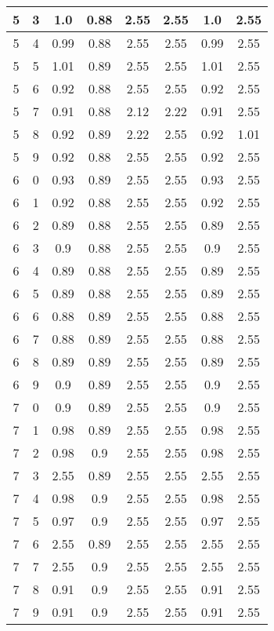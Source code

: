 \begin{longtable}{|c|c||c||c|c|c||c|c|}
	5 & 3 & 1.0 & 0.88 & 2.55 & 2.55 & 1.0 & 2.55 \\ \hline
	5 & 4 & 0.99 & 0.88 & 2.55 & 2.55 & 0.99 & 2.55 \\ \hline
	5 & 5 & 1.01 & 0.89 & 2.55 & 2.55 & 1.01 & 2.55 \\ \hline
	5 & 6 & 0.92 & 0.88 & 2.55 & 2.55 & 0.92 & 2.55 \\ \hline
	5 & 7 & 0.91 & 0.88 & 2.12 & 2.22 & 0.91 & 2.55 \\ \hline
	5 & 8 & 0.92 & 0.89 & 2.22 & 2.55 & 0.92 & 1.01 \\ \hline
	5 & 9 & 0.92 & 0.88 & 2.55 & 2.55 & 0.92 & 2.55 \\ \hline
	6 & 0 & 0.93 & 0.89 & 2.55 & 2.55 & 0.93 & 2.55 \\ \hline
	6 & 1 & 0.92 & 0.88 & 2.55 & 2.55 & 0.92 & 2.55 \\ \hline
	6 & 2 & 0.89 & 0.88 & 2.55 & 2.55 & 0.89 & 2.55 \\ \hline
	6 & 3 & 0.9 & 0.88 & 2.55 & 2.55 & 0.9 & 2.55 \\ \hline
	6 & 4 & 0.89 & 0.88 & 2.55 & 2.55 & 0.89 & 2.55 \\ \hline
	6 & 5 & 0.89 & 0.88 & 2.55 & 2.55 & 0.89 & 2.55 \\ \hline
	6 & 6 & 0.88 & 0.89 & 2.55 & 2.55 & 0.88 & 2.55 \\ \hline
	6 & 7 & 0.88 & 0.89 & 2.55 & 2.55 & 0.88 & 2.55 \\ \hline
	6 & 8 & 0.89 & 0.89 & 2.55 & 2.55 & 0.89 & 2.55 \\ \hline
	6 & 9 & 0.9 & 0.89 & 2.55 & 2.55 & 0.9 & 2.55 \\ \hline
	7 & 0 & 0.9 & 0.89 & 2.55 & 2.55 & 0.9 & 2.55 \\ \hline
	7 & 1 & 0.98 & 0.89 & 2.55 & 2.55 & 0.98 & 2.55 \\ \hline
	7 & 2 & 0.98 & 0.9 & 2.55 & 2.55 & 0.98 & 2.55 \\ \hline
	7 & 3 & 2.55 & 0.89 & 2.55 & 2.55 & 2.55 & 2.55 \\ \hline
	7 & 4 & 0.98 & 0.9 & 2.55 & 2.55 & 0.98 & 2.55 \\ \hline
	7 & 5 & 0.97 & 0.9 & 2.55 & 2.55 & 0.97 & 2.55 \\ \hline
	7 & 6 & 2.55 & 0.89 & 2.55 & 2.55 & 2.55 & 2.55 \\ \hline
	7 & 7 & 2.55 & 0.9 & 2.55 & 2.55 & 2.55 & 2.55 \\ \hline
	7 & 8 & 0.91 & 0.9 & 2.55 & 2.55 & 0.91 & 2.55 \\ \hline
	7 & 9 & 0.91 & 0.9 & 2.55 & 2.55 & 0.91 & 2.55 \\ \hline
\end{longtable}
